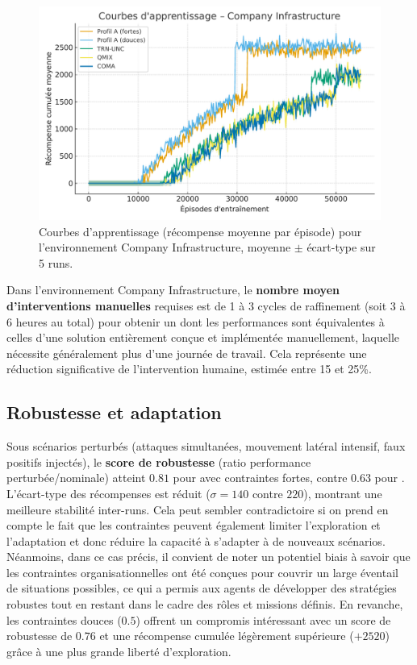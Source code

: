 \begin{figure}[h!]
  \centering
  \includegraphics[width=0.75\linewidth]{figures/results_infra_learning.pdf}
  \caption{Courbes d'apprentissage (récompense moyenne par épisode) pour l'environnement Company Infrastructure, moyenne $\pm$ écart-type sur 5 runs.}
  \label{fig:infra_learning_curves}
\end{figure}

Dans l'environnement Company Infrastructure, le \textbf{nombre moyen d'interventions manuelles} requises est de 1 à 3 cycles de raffinement (soit 3 à 6 heures au total) pour obtenir un  dont les performances sont équivalentes à celles d'une solution entièrement conçue et implémentée manuellement, laquelle nécessite généralement plus d'une journée de travail. Cela représente une réduction significative de l'intervention humaine, estimée entre 15 et 25\%.

\subsection*{Robustesse et adaptation}

Sous scénarios perturbés (attaques simultanées, mouvement latéral intensif, faux positifs injectés), le \textbf{score de robustesse} (ratio performance perturbée/nominale) atteint $0.81$ pour  avec contraintes fortes, contre $0.63$ pour .
L'écart-type des récompenses est réduit ($\sigma = 140$ contre $220$), montrant une meilleure stabilité inter-runs. Cela peut sembler contradictoire si on prend en compte le fait que les contraintes peuvent également limiter l'exploration et l'adaptation et donc réduire la capacité à s'adapter à de nouveaux scénarios. Néanmoins, dans ce cas précis, il convient de noter un potentiel biais à savoir que les contraintes organisationnelles ont été conçues pour couvrir un large éventail de situations possibles, ce qui a permis aux agents de développer des stratégies robustes tout en restant dans le cadre des rôles et missions définis.
En revanche, les contraintes douces ($0.5$) offrent un compromis intéressant avec un score de robustesse de $0.76$ et une récompense cumulée légèrement supérieure ($+2520$) grâce à une plus grande liberté d'exploration.

